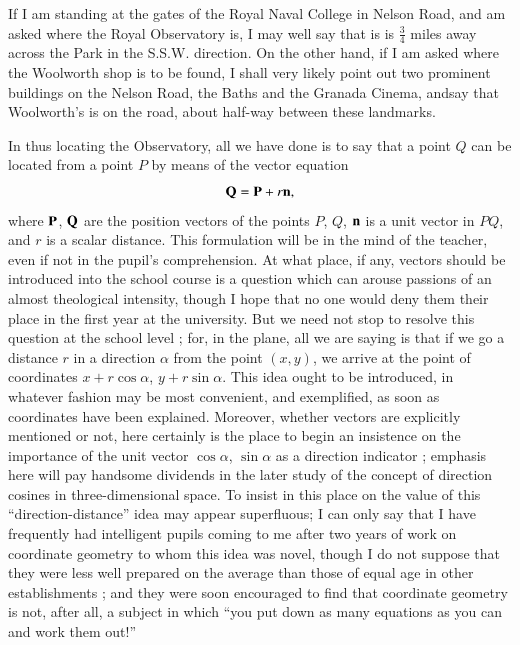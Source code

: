 If I am standing at the gates of the Royal Naval College in Nelson
Road, and am asked where the Royal Observatory is, I may well say that
is is $\frac{3}{4}$ miles away across the Park in the
S.S.W. direction. On the other hand, if I am asked where the Woolworth
shop is to be found, I shall very likely point out two prominent
buildings on the Nelson Road, the Baths and the Granada Cinema,
and\pageoriginale say that Woolworth's is on the road, about half-way
between these landmarks.

In thus locating the Observatory, all we have done is to say that a
point $Q$ can be located from a point $P$ by means of the vector
equation
$$
\mathbf{Q} = \mathbf{P} + r \mathbf{n},
$$
where $\mathbf{P}$, $\mathbf{Q}$ are the position vectors of the points $P$, $Q$,
$\mathbf{n}$ is a unit vector in $PQ$, and $r$ is a scalar distance. This
formulation will be in the mind of the teacher, even if not in the
pupil's comprehension. At what place, if any, vectors should be
introduced into the school course is a question which can arouse
passions of an almost theological intensity, though I hope that no one
would deny them their place in the first year at the university. But
we need not stop to resolve this question at the school level ; for,
in the plane, all we are saying is that if we go a distance $r$ in a
direction $\alpha$ from the point $(x,y)$, we arrive at the point of
coordinates $x + r \cos \alpha$, $y + r \sin \alpha$. This idea ought
to be introduced, in whatever fashion may be most convenient, and
exemplified, as soon as coordinates have been explained. Moreover,
whether vectors are explicitly mentioned or not, here certainly is the
place to begin an insistence on the importance of the unit vector
$\cos \alpha$, $\sin \alpha$ as a  direction indicator ; emphasis here
will pay handsome dividends in the later study of the concept of
direction cosines in three-dimensional space. To insist in this place
on the value of this ``direction-distance'' idea may appear
superfluous; I can only say that I have frequently had intelligent
pupils coming to me after two years of work on coordinate geometry to
whom this idea was novel, though I do not suppose that they were less
well prepared on the average than those of equal age in other
establishments ; and they were soon encouraged to find that coordinate
geometry is not, after all, a subject in which ``you put down as many
equations as you can and work them out!''

